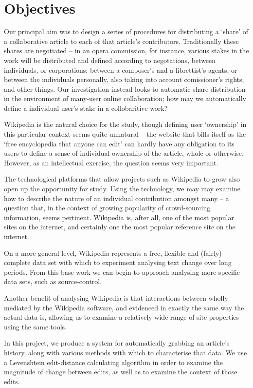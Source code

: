 \section{Objectives}
Our principal aim was to design a series of procedures for
distributing a `share' of a collaborative article to each of that
article's contributors. Traditionally these shares are negotiated --
in an opera commission, for instance, various stakes in the work will
be distributed and defined according to negotations, between
individuals, or corporations; between a composer's and a librettist's
agents, or between the individuals personally, also taking into
account comissioner's rights, and other things. Our investigation
instead looks to automatic share distribution in the environment of
many-user online collaboration; how may we automatically define a
individual user's stake in a collobaritive work?

Wikipedia is the natural choice for the study, though defining user
`ownership' in this particular context seems quite unnatural -- the
website that bills itself as the `free encyclopedia that anyone can
edit' can hardly have any obligation to its users to define a sense of
individual ownership of the article, whole or otherwise. However, as
an intellectual exercise, the question seems very important. 

The technological platforms that allow projects such as Wikipedia to
grow also open up the opportunity for study. Using the technology, we
may may examine how to describe the nature of an individual
contribution amongst many -- a question that, in the context of
growing popularity of crowd-sourcing information, seems
pertinent. Wikipedia is, after all, one of the most popular sites on
the internet, and certainly one the most popular reference site on the
internet.

On a more general level, Wikipedia represents a free, flexible and
(fairly) complete data set with which to experiment analysing text
change over long periods. From this base work we can begin to approach
analysing more specific data sets, such as source-control.

Another benefit of analysing Wikipedia is that interactions between
wholly mediated by the Wikipedia software, and evidenced in exactly
the same way the actual data is, allowing us to examine a relatively
wide range of site properties using the same tools.

In this project, we produce a system for automatically grabbing an
article's history, along with various methods with which to
characterise that data. We use a Levenshtein edit-distance calculating
algorithm in order to examine the magnitude of change between edits,
as well as to examine the context of those edits.


